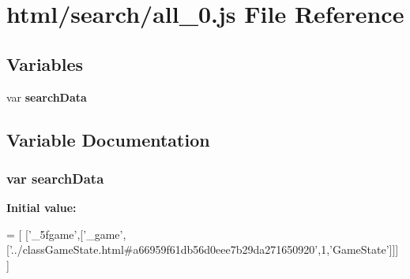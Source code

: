 \section{html/search/all\-\_\-0.js File Reference}
\label{all__0_8js}
\subsection*{Variables}
\begin{DoxyCompactItemize}
\item 
var {\bf search\-Data}
\end{DoxyCompactItemize}


\subsection{Variable Documentation}
\subsubsection[{search\-Data}]{\setlength{\rightskip}{0pt plus 5cm}var search\-Data}\label{all__0_8js_ad01a7523f103d6242ef9b0451861231e}
{\bfseries Initial value\-:}
\begin{DoxyCode}
=
[
  [\textcolor{stringliteral}{'\_5fgame'},[\textcolor{stringliteral}{'\_game'},[\textcolor{stringliteral}{'../classGameState.html#a66959f61db56d0eee7b29da271650920'},1,\textcolor{stringliteral}{'GameState'}]]]
]
\end{DoxyCode}
